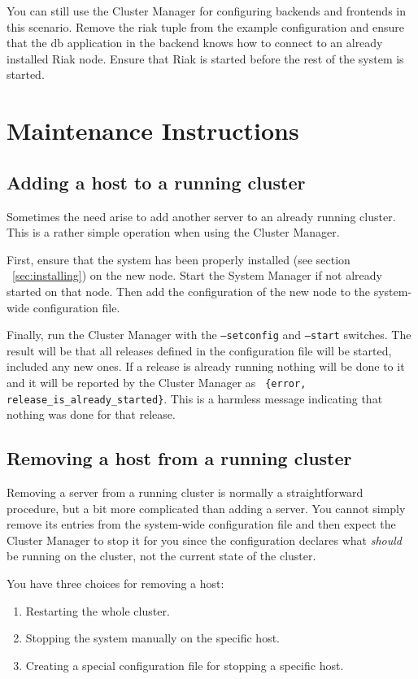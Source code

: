 \documentclass[11pt,a4paper]{report}
\begin{document}
You can still use the Cluster Manager for configuring backends and frontends in
this scenario. Remove the riak tuple from the example configuration and ensure
that the db application in the backend knows how to connect to an already
installed Riak node. Ensure that Riak is started before the rest of the system
is started.
\chapter{Maintenance Instructions}
\section{Adding a host to a running cluster}
Sometimes the need arise to add another server to an already running
cluster. This is a rather simple operation when using the Cluster Manager.

First, ensure that the system has been properly installed (see section
~\ref{sec:installing}) on the new node. Start the System Manager if not already
started on that node. Then add the configuration of the new node to the
system-wide configuration file.

Finally, run the Cluster Manager with the {\tt --setconfig} and {\tt --start}
switches. The result will be that all releases defined in the configuration file
will be started, included any new ones. If a release is already running nothing
will be done to it and it will be reported by the Cluster Manager as {\tt
  \{error, release\_is\_already\_started\}}. This is a harmless message
indicating that nothing was done for that release.
\section{Removing a host from a running cluster}
Removing a server from a running cluster is normally a straightforward
procedure, but a bit more complicated than adding a server. You cannot simply
remove its entries from the system-wide configuration file and then expect the
Cluster Manager to stop it for you since the configuration declares what
\emph{should} be running on the cluster, not the current state of the cluster.

You have three choices for removing a host:
\begin{enumerate}
  \item Restarting the whole cluster.
  \item Stopping the system manually on the specific host.
  \item Creating a special configuration file for stopping a specific host.
\end{enumerate}
\end{document}
